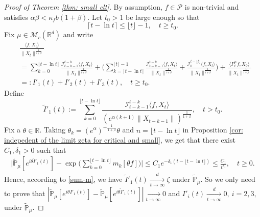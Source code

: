 \documentclass[12pt,a4paper]{amsart}
\theoremstyle{plain}
\theoremstyle{definition}
\numberwithin{equation}{section}
\begin{document}
\begin{proof}[Proof of Theorem \ref{thm: small clt}]
 By assumption, $f\in \mathcal P$ is non-trivial and satisfies $\alpha \beta < \kappa_f b(1+\beta)$.
	Let $t_0 > 1$ be large enough so that
\[
	\lceil t - \ln t\rceil
	\leq \lfloor t \rfloor - 1,
	\quad t\geq t_0.
\]
Fix $\mu\in \mathcal M_c(\mathbb R^d)$ and write
\begin{align}
	&\frac{\langle f,X_t\rangle}{\|X_t\|^{\frac{1}{1+\beta}}}
	\\&=\sum_{k=0}^{\lfloor t-\ln t \rfloor} \frac{\mathcal I_{t-k-1}^{t-k}\langle f ,X_t\rangle}{\|X_t\|^{\frac{1}{1+\beta}}}+ \Big(\sum_{k=\lceil t-\ln t \rceil}^{\lfloor t \rfloor-1} \frac{\mathcal I_{t-k-1}^{t-k}\langle f ,X_t\rangle}{\|X_t\|^{\frac{1}{1+\beta}}}+\frac{\mathcal I_0^{t-\lfloor t \rfloor}\langle f ,X_t\rangle}{\|X_t\|^{\frac{1}{1+\beta}}}\Big) +
\frac{\langle P^\alpha_t f, X_0\rangle}{\|X_t\|^{\frac{1}{1+\beta}}}
	\\&=:I'_1(t)+I'_2(t)+I'_3(t),
	\quad t\geq t_0.
\end{align}
	Define
\[
 	\tilde I'_1(t)
 	:=\sum_{k=0}^{\lfloor t-\ln t \rfloor}\frac{\mathcal I_{t-k-1}^{t-k}\langle f ,X_t\rangle}{( e^{\alpha(k+1)}\|X_{t-k-1}\|)^{\frac{1}{1+\beta}}},
 	\quad t > t_0.
\]
    Fix a $\theta\in \mathbb R$.
    Taking $\theta_k=(e^{\alpha})^{-\frac{1}{1+\beta}} \theta $ and $n={\lfloor t-\ln t \rfloor}$ in Proposition \ref{cor: indepedent of the limit zeta for critical and small},
    we get that there exist $C_1,\delta_1 > 0$ such that
\begin{align}
    \Big|\mathbb{\tilde{P}}_{\mu} [e^{i\theta\tilde I'_1(t)} ]-\exp\Big(\sum_{k=0}^{\lfloor t-\ln t \rfloor}m_k[\theta f]\Big)\Big|
    \leq C_1 e^{-\delta_1(t - \lfloor t - \ln t\rfloor)}
    \leq \frac{C_1}{t^{\delta_1}},
    \quad t\geq 0.
\end{align}
    Hence, according to \eqref{sum-m}, we have $\tilde I'_1(t)\xrightarrow[t\to \infty]{d} \zeta$ under $\tilde {\mathbb P}_\mu$.
    So we only need to prove that $|\mathbb{\tilde{P}}_{\mu}[e^{i\theta I'_1(t)}]-\mathbb{\tilde{P}}_{\mu}[e^{i\theta\tilde I'_1(t)}]|\xrightarrow[t\to \infty]{} 0$ and $I'_i(t)\xrightarrow[t\to \infty]{d} 0,~i=2,3,$ under $\tilde {\mathbb P}_\mu$.


\end{proof}
\end{document}
